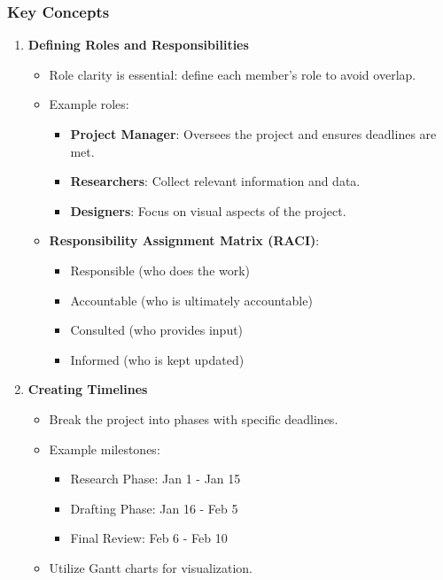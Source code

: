 \documentclass[aspectratio=169]{beamer}
\begin{document}
\begin{frame}[fragile]
    \frametitle{Key Concepts}
    \begin{enumerate}
        \item \textbf{Defining Roles and Responsibilities}
        \begin{itemize}
            \item Role clarity is essential: define each member's role to avoid overlap.
            \item Example roles:
            \begin{itemize}
                \item \textbf{Project Manager}: Oversees the project and ensures deadlines are met.
                \item \textbf{Researchers}: Collect relevant information and data.
                \item \textbf{Designers}: Focus on visual aspects of the project.
            \end{itemize}
            \item \textbf{Responsibility Assignment Matrix (RACI)}:
            \begin{itemize}
                \item Responsible (who does the work)
                \item Accountable (who is ultimately accountable)
                \item Consulted (who provides input)
                \item Informed (who is kept updated)
            \end{itemize}
        \end{itemize}
        
        \item \textbf{Creating Timelines}
        \begin{itemize}
            \item Break the project into phases with specific deadlines.
            \item Example milestones:
            \begin{itemize}
                \item Research Phase: Jan 1 - Jan 15
                \item Drafting Phase: Jan 16 - Feb 5
                \item Final Review: Feb 6 - Feb 10
            \end{itemize}
            \item Utilize Gantt charts for visualization.
        \end{itemize}
    \end{enumerate}
\end{frame}
\end{document}

